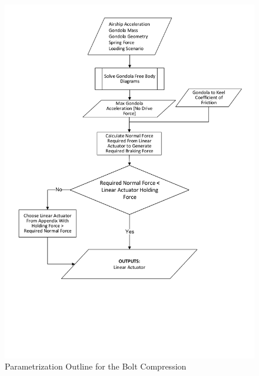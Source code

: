 \documentclass[../main.tex]{subfiles}
\begin{document}
\begin{figure}[H]
	\centering
	\includegraphics[width=\linewidth]{img/paramaterization/linearActuator.pdf}
	\caption{Parametrization Outline for the Bolt Compression}
	\label{fig:linearActuatorParametrization}
\end{figure}
\end{document}
